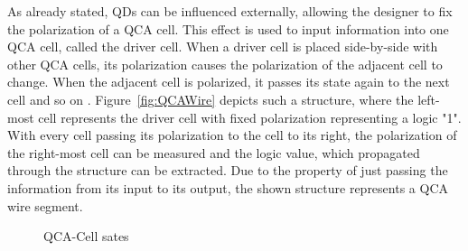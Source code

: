 As already stated, QDs can be influenced externally, allowing the designer to fix the polarization of a QCA cell. This effect is used to input information into one QCA cell, called the driver cell. When a driver cell is placed side-by-side with other QCA cells, its polarization causes the polarization of the adjacent cell to change. When the adjacent cell is polarized, it passes its state again to the next cell and so on \cite{lent1997device}. Figure~\ref{fig:QCAWire} depicts such a structure, where the left-most cell represents the driver cell with fixed polarization representing a logic "1". With every cell passing its polarization to the cell to its right, the polarization of the right-most cell can be measured and the logic value, which propagated through the structure can be extracted. Due to the property of just passing the information from its input to its output, the shown structure represents a QCA wire segment.

\begin{figure}
	\centering

	\caption{QCA-Cell sates} \label{fig:QCAStates}
\end{figure}


